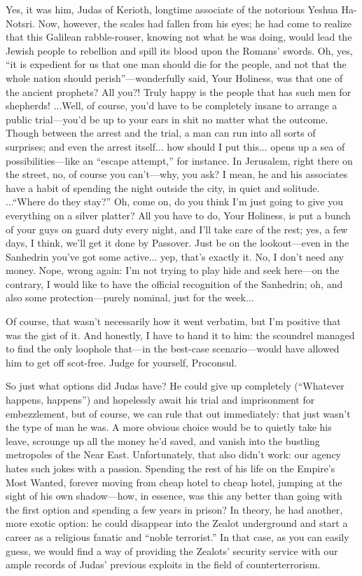 Yes, it was him, Judas of Kerioth, longtime associate of the notorious Yeshua Ha-Notsri. Now, however, the scales had fallen from his eyes; he had come to realize that this Galilean rabble-rouser, knowing not what he was doing, would lead the Jewish people to rebellion and spill its blood upon the Romans' swords. Oh, yes, ``it is expedient for us that one man should die for the people, and not that the whole nation should perish''---wonderfully said, Your Holiness, was that one of the ancient prophets? All you?! Truly happy is the people that has such men for shepherds! ...Well, of course, you'd have to be completely insane to arrange a public trial---you'd be up to your ears in shit no matter what the outcome. Though between the arrest and the trial, a man can run into all sorts of surprises; and even the arrest itself... how should I put this... opens up a sea of possibilities---like an ``escape attempt,'' for instance. In Jerusalem, right there on the street, no, of course you can't---why, you ask? I mean, he and his associates have a habit of spending the night outside the city, in quiet and solitude. ...``Where do they stay?'' Oh, come on, do you think I'm just going to give you everything on a silver platter? All you have to do, Your Holiness, is put a bunch of your guys on guard duty every night, and I'll take care of the rest; yes, a few days, I think, we'll get it done by Passover. Just be on the lookout---even in the Sanhedrin you've got some active... yep, that's exactly it. No, I don't need any money. Nope, wrong again: I'm not trying to play hide and seek here---on the contrary, I would like to have the official recognition of the Sanhedrin; oh, and also some protection---purely nominal, just for the week...

Of course, that wasn't necessarily how it went verbatim, but I'm positive that was the gist of it. And honestly, I have to hand it to him: the scoundrel managed to find the only loophole that---in the best-case scenario---would have allowed him to get off scot-free. Judge for yourself, Proconsul.

So just what options did Judas have? He could give up completely (``Whatever happens, happens'') and hopelessly await his trial and imprisonment for embezzlement, but of course, we can rule that out immediately: that just wasn't the type of man he was. A more obvious choice would be to quietly take his leave, scrounge up all the money he'd saved, and vanish into the bustling metropoles of the Near East. Unfortunately, that also didn't work: our agency hates such jokes with a passion. Spending the rest of his life on the Empire's Most Wanted, forever moving from cheap hotel to cheap hotel, jumping at the sight of his own shadow---how, in essence, was this any better than going with the first option and spending a few years in prison? In theory, he had another, more exotic option: he could disappear into the Zealot underground and start a career as a religious fanatic and ``noble terrorist.'' In that case, as you can easily guess, we would find a way of providing the Zealots' security service with our ample records of Judas' previous exploits in the field of counterterrorism.

